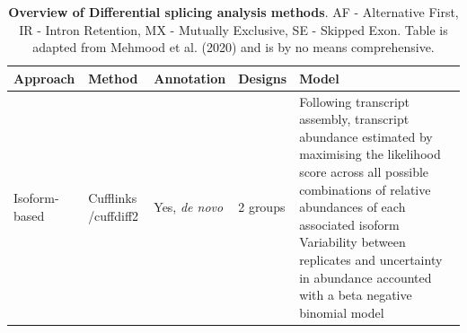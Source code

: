 \begin{changemargin}{1.5cm}	
	\begin{landscape}
		\small %
		\setlength\tabcolsep{2pt} %
		\renewcommand{\arraystretch}{1}
	\begin{longtable}[c]{p{2.5cm}p{2cm}p{2cm}p{2.5cm}p{17cm}}
		\caption[Overview of Differential splicing analysis methods]%
		{\textbf{Overview of Differential splicing analysis methods}. \newline AF - Alternative First, IR - Intron Retention, MX - Mutually Exclusive, SE - Skipped Exon. Table is adapted from Mehmood et al. (2020) \cite{Mehmood2020} and is by no means comprehensive. }
		\label{tab: rnaseq_diffsplicing}\\
		\toprule
		Approach &
		Method &
		Annotation &
		Designs &
		Model \\ \midrule
		\multirow{2}{*}{Isoform-based} &
		Cufflinks \newline /cuffdiff2 &
		Yes, \textit{de novo} &
		2 groups &
		\tabitem Following transcript assembly, transcript abundance estimated by maximising the likelihood score across all possible combinations of relative abundances of each associated isoform \newline 
		\tabitem Variability between  replicates and uncertainty in abundance accounted with a beta negative   binomial model \\ 
		

\end{longtable}
\end{landscape}
\end{changemargin}
